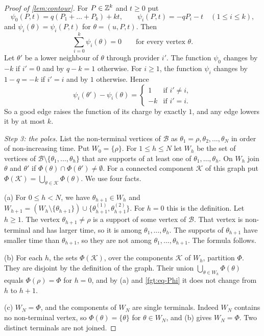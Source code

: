 \begin{proof}[Proof of \cref{lem:contour}]
For $P\in\mathbb{Z}^k$ and $t\ge0$ put
\[
\psi_0(P,t)=q(P_1+\dots+P_k)+kt,\qquad \psi_i(P,t)=-qP_i-t\quad(1\le i\le k),
\]
and $\psi_i(\theta)=\psi_i(P,t)$ for $\theta=(u,P,t)$. Then
\begin{equation}\label{fgt:eq-sum}
\sum_{i=0}^k\psi_i(\theta)=0\qquad\text{for every vertex }\theta.
\end{equation}
Let $\theta'$ be a lower neighbour of $\theta$ through provider $i'$. The function $\psi_0$ changes by $-k$ if $i'=0$ and by $q-k=1$ otherwise. For $i\ge1$, the function $\psi_i$ changes by $1-q=-k$ if $i'=i$ and by $1$ otherwise. Hence
\begin{equation}\label{fgt:eq-incr}
\psi_i(\theta')-\psi_i(\theta)=\begin{cases}1&\text{if }i'\ne i,\\-k&\text{if }i'=i.\end{cases}
\end{equation}
So a good edge raises the function of its charge by exactly $1$, and any edge lowers it by at most $k$.

\emph{Step 3: the poles.} List the non-terminal vertices of $\mathcal B$ as $\theta_1=\rho,\theta_2,\dots,\theta_N$ in order of non-increasing time. Put $W_0=\{\rho\}$. For $1\le h\le N$ let $W_h$ be the set of vertices of $\mathcal B\setminus\{\theta_1,\dots,\theta_h\}$ that are supports of at least one of $\theta_1,\dots,\theta_h$. On $W_h$ join $\theta$ and $\theta'$ if $\Phi(\theta)\cap\Phi(\theta')\ne\emptyset$. For a connected component $\mathcal K$ of this graph put $\Phi(\mathcal K)=\bigcup_{\theta\in\mathcal K}\Phi(\theta)$. We use four facts.

(a) For $0\le h<N$, we have $\theta_{h+1}\in W_h$ and $W_{h+1}=(W_h\setminus\{\theta_{h+1}\})\cup\{\theta_{h+1}^{(1)},\theta_{h+1}^{(2)}\}$. For $h=0$ this is the definition. Let $h\ge1$. The vertex $\theta_{h+1}\ne\rho$ is a support of some vertex of $\mathcal B$. That vertex is non-terminal and has larger time, so it is among $\theta_1,\dots,\theta_h$. The supports of $\theta_{h+1}$ have smaller time than $\theta_{h+1}$, so they are not among $\theta_1,\dots,\theta_{h+1}$. The formula follows.

(b) For each $h$, the sets $\Phi(\mathcal K)$, over the components $\mathcal K$ of $W_h$, partition $\Phi$. They are disjoint by the definition of the graph. Their union $\bigcup_{\theta\in W_h}\Phi(\theta)$ equals $\Phi(\rho)=\Phi$ for $h=0$, and by (a) and \eqref{fgt:eq-Phi} it does not change from $h$ to $h+1$.

(c) $W_N=\Phi$, and the components of $W_N$ are single terminals. Indeed $W_N$ contains no non-terminal vertex, so $\Phi(\theta)=\{\theta\}$ for $\theta\in W_N$, and (b) gives $W_N=\Phi$. Two distinct terminals are not joined.


\end{proof}
